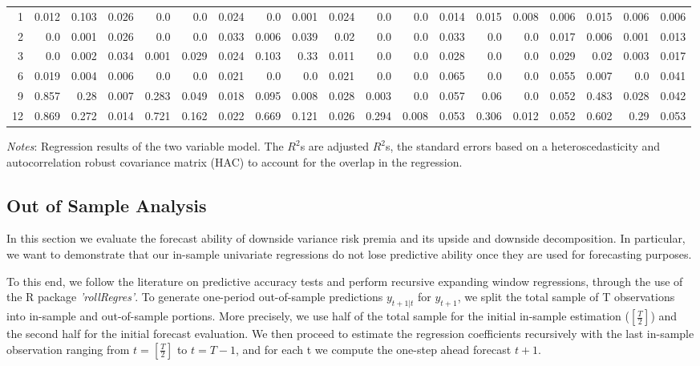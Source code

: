 \begin{landscape}
\begin{table}[h]
\begin{center}
\begin{tabular}{@{\extracolsep{5pt}}rrrrrrrrrrrrrrrrrrr@{}}
\hline

1 & 0.012 & 0.103 & 0.026 & 0.0 & 0.0 & 0.024 & 0.0 & 0.001 & 0.024 & 0.0 & 0.0 & 0.014 & 0.015 & 0.008 & 0.006 & 0.015 & 0.006 & 0.006 \\[6pt]
2 & 0.0 & 0.001 & 0.026 & 0.0 & 0.0 & 0.033 & 0.006 & 0.039 & 0.02 & 0.0 & 0.0 & 0.033 & 0.0 & 0.0 & 0.017 & 0.006 & 0.001 & 0.013 \\[6pt]
3 & 0.0 & 0.002 & 0.034 & 0.001 & 0.029 & 0.024 & 0.103 & 0.33 & 0.011 & 0.0 & 0.0 & 0.028 & 0.0 & 0.0 & 0.029 & 0.02 & 0.003 & 0.017 \\[6pt]
6 & 0.019 & 0.004 & 0.006 & 0.0 & 0.0 & 0.021 & 0.0 & 0.0 & 0.021 & 0.0 & 0.0 & 0.065 & 0.0 & 0.0 & 0.055 & 0.007 & 0.0 & 0.041 \\[6pt]
9 & 0.857 & 0.28 & 0.007 & 0.283 & 0.049 & 0.018 & 0.095 & 0.008 & 0.028 & 0.003 & 0.0 & 0.057 & 0.06 & 0.0 & 0.052 & 0.483 & 0.028 & 0.042 \\[6pt]
12 & 0.869 & 0.272 & 0.014 & 0.721 & 0.162 & 0.022 & 0.669 & 0.121 & 0.026 & 0.294 & 0.008 & 0.053 & 0.306 & 0.012 & 0.052 & 0.602 & 0.29 & 0.053 \\[6pt]

\hline

\end{tabular}
\end{center}
\textit{Notes}: Regression results of the two variable model. The $R^{2}$s are adjusted $R^{2}$s, the standard errors based on a heteroscedasticity and autocorrelation robust covariance matrix (HAC) to account for the overlap in the regression. 

\end{table}

\end{landscape}

\restoregeometry


\subsection{Out of Sample Analysis}
In this section we evaluate the forecast ability of downside variance risk premia and its upside and downside decomposition. In particular, we want to demonstrate that our in-sample univariate regressions do not lose predictive ability once they are used for forecasting purposes. 

\vspace{4mm}
To this end, we follow the literature on predictive accuracy tests and perform recursive expanding window regressions, through the use of the R package \textit{'rollRegres'}. 
To generate one-period out-of-sample predictions $y_{t+1|t}$ for $y_{t+1}$, we split the total sample of T observations into in-sample and out-of-sample portions. More precisely, we use half of the total sample for the initial in-sample estimation ($[\frac{T}{2}]$) and the second half for the initial forecast evaluation.  We then proceed to estimate the regression coefficients recursively with the last in-sample observation ranging from $t=[\frac{T}{2}]$ to $t=T-1$, and for each t we compute the one-step ahead forecast $t+1$. 


